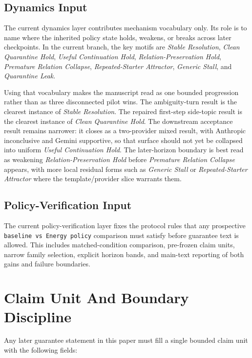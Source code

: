 \documentclass[11pt]{article}
\begin{document}
\subsection{Dynamics Input}

The current dynamics layer contributes mechanism vocabulary only. Its role is to
name where the inherited policy state holds, weakens, or breaks across later
checkpoints. In the current branch, the key motifs are \textit{Stable
Resolution}, \textit{Clean Quarantine Hold}, \textit{Useful Continuation Hold},
\textit{Relation-Preservation Hold}, \textit{Premature Relation Collapse},
\textit{Repeated-Starter Attractor}, \textit{Generic Stall}, and
\textit{Quarantine Leak}.

Using that vocabulary makes the manuscript read as one bounded progression rather
than as three disconnected pilot wins. The ambiguity-turn result is the clearest
instance of \textit{Stable Resolution}. The repaired first-step side-topic result
is the clearest instance of \textit{Clean Quarantine Hold}. The downstream
acceptance result remains narrower: it closes as a two-provider mixed result,
with Anthropic inconclusive and Gemini supportive, so that surface should not
yet be collapsed into uniform \textit{Useful Continuation Hold}. The later-horizon
boundary is best read as weakening \textit{Relation-Preservation Hold} before
\textit{Premature Relation Collapse} appears, with more local residual forms such
as \textit{Generic Stall} or \textit{Repeated-Starter Attractor} where the
template/provider slice warrants them.

\subsection{Policy-Verification Input}

The current policy-verification layer fixes the protocol rules that any prospective
\texttt{baseline vs Energy policy} comparison must satisfy before guarantee text is
allowed. This includes matched-condition comparison, pre-frozen claim units, narrow
family selection, explicit horizon bands, and main-text reporting of both gains and
failure boundaries.

\section{Claim Unit And Boundary Discipline}

Any later guarantee statement in this paper must fill a single bounded claim unit
with the following fields:
\end{document}
